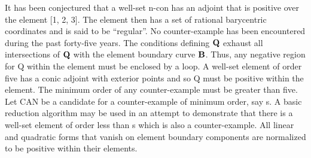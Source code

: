 \documentclass{article}
\begin{document}
It has been conjectured that a well-set n-con has an adjoint that is positive over the element [1, 2, 3].  The element then has a set of rational barycentric coordinates and is said to be ``regular''.  No counter-example has been encountered during the past forty-five years.  The conditions defining $\bf{Q}$ exhaust all intersections of $\bf{Q}$ with the element boundary curve $\bf{B}$. Thus, any negative region for Q within the element must be enclosed by a loop.   A well-set element of order five has a conic adjoint with exterior points and so Q must be positive within the element.  The minimum order of any counter-example must be greater than five.  Let CAN be a candidate for a counter-example of minimum order, say s.  A basic reduction algorithm may be used in an attempt to demonstrate that there is a well-set element of order less than s which is also a counter-example.  All linear and quadratic forms that vanish on element 
boundary components are normalized to be positive within their elements.
\end{document}
